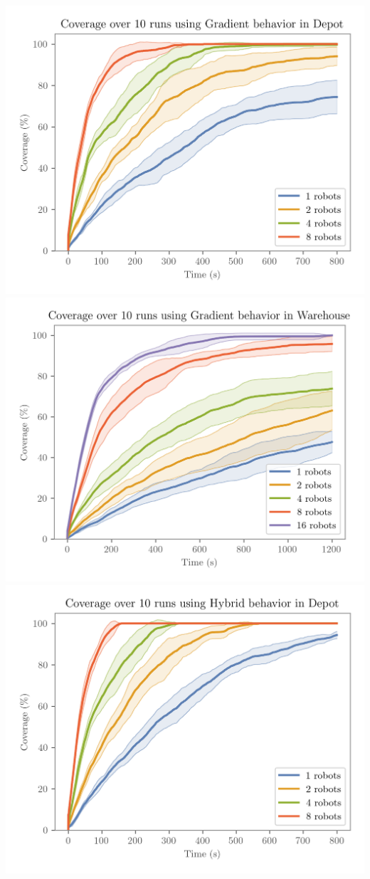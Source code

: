 \includegraphics[width=\w]{figures/plots/benchmarks/coverage-over-10-runs-using-gradient-behavior-in-depot.png}
\includegraphics[width=\w]{figures/plots/benchmarks/coverage-over-10-runs-using-gradient-behavior-in-warehouse.png}
\\
\includegraphics[width=\w]{figures/plots/benchmarks/coverage-over-10-runs-using-hybrid-behavior-in-depot.png}
